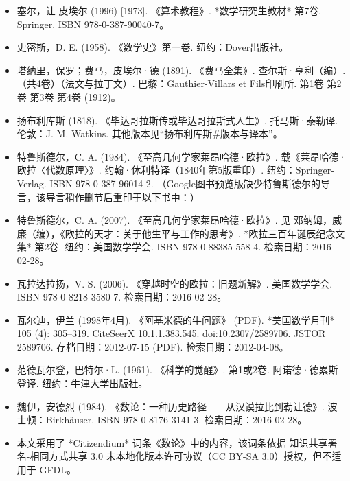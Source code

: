 \begin{itemize}
\item 塞尔，让-皮埃尔 (1996) [1973]. 《算术教程》. *数学研究生教材* 第7卷. Springer. ISBN 978-0-387-90040-7。
\item 史密斯，D. E. (1958). 《数学史》第一卷. 纽约：Dover出版社。
\item 塔纳里，保罗；费马，皮埃尔·德 (1891). 《费马全集》. 查尔斯·亨利（编）. （共4卷）（法文与拉丁文）. 巴黎：Gauthier-Villars et Fils印刷所. 第1卷 第2卷 第3卷 第4卷 (1912)。
\item 扬布利库斯 (1818). 《毕达哥拉斯传或毕达哥拉斯式人生》. 托马斯·泰勒译. 伦敦：J. M. Watkins. 其他版本见“扬布利库斯#版本与译本”。
\item 特鲁斯德尔，C. A. (1984). 《至高几何学家莱昂哈德·欧拉》. 载《莱昂哈德·欧拉〈代数原理〉》. 约翰·休利特译（1840年第5版重印）. 纽约：Springer-Verlag. ISBN 978-0-387-96014-2. （Google图书预览版缺少特鲁斯德尔的导言，该导言稍作删节后重印于以下书中：）
\item 特鲁斯德尔，C. A. (2007). 《至高几何学家莱昂哈德·欧拉》. 见 邓纳姆，威廉（编），《欧拉的天才：关于他生平与工作的思考》. *欧拉三百年诞辰纪念文集* 第2卷. 纽约：美国数学学会. ISBN 978-0-88385-558-4. 检索日期：2016-02-28。
\item 瓦拉达拉扬，V. S. (2006). 《穿越时空的欧拉：旧题新解》. 美国数学学会. ISBN 978-0-8218-3580-7. 检索日期：2016-02-28。
\item 瓦尔迪，伊兰 (1998年4月). 《阿基米德的牛问题》 (PDF). *美国数学月刊* 105 (4): 305–319. CiteSeerX 10.1.1.383.545. doi:10.2307/2589706. JSTOR 2589706. 存档日期：2012-07-15 (PDF). 检索日期：2012-04-08。
\item 范德瓦尔登，巴特尔·L. (1961). 《科学的觉醒》. 第1或2卷. 阿诺德·德累斯登译. 纽约：牛津大学出版社。
\item 魏伊，安德烈 (1984). 《数论：一种历史路径——从汉谟拉比到勒让德》. 波士顿：Birkhäuser. ISBN 978-0-8176-3141-3. 检索日期：2016-02-28。
\item 本文采用了 *Citizendium* 词条《数论》中的内容，该词条依据 知识共享署名-相同方式共享 3.0 未本地化版本许可协议（CC BY-SA 3.0）授权，但不适用于 GFDL。

\end{itemize}